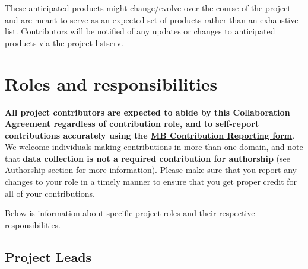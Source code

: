 \documentclass[
  letterpaper,
  DIV=11,
  numbers=noendperiod,
  oneside]{scrreprt}
\begin{document}
These anticipated products might change/evolve over the course of the
project and are meant to serve as an expected set of products rather
than an exhaustive list. Contributors will be notified of any updates or
changes to anticipated products via the project listserv.

\section*{Roles and responsibilities}\label{roles-and-responsibilities}


\textbf{All project contributors are expected to abide by this
Collaboration Agreement regardless of contribution role, and to
self-report contributions accurately using the
\href{manybabies.org/credit}{MB Contribution Reporting form}}. We
welcome individuals making contributions in more than one domain, and
note that \textbf{data collection is not a required contribution for
authorship} (see Authorship section for more information). Please make
sure that you report any changes to your role in a timely manner to
ensure that you get proper credit for all of your contributions.

Below is information about specific project roles and their respective
responsibilities.

\subsection{Project Leads}\label{project-leads}
\end{document}
